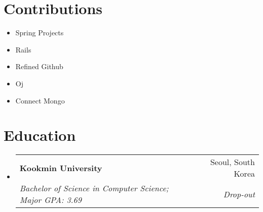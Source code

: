 \documentclass[letterpaper,11pt]{article}
\makeatletter
\newcommand{\resumeItem}[2]{
  \item\small{
    \textbf{#1}{: #2 \vspace{-2pt}}
  }
}
\newcommand{\resumeSubheading}[4]{
  \vspace{-1pt}\item
    \begin{tabular*}{0.97\textwidth}[t]{l@{\extracolsep{\fill}}r}
      \textbf{#1} & #2 \\
      \textit{\small#3} & \textit{\small #4} \\
    \end{tabular*}\vspace{-5pt}
}
\newcommand{\resumeSubItem}[2]{\resumeItem{#1}{#2}\vspace{-4pt}}
\newcommand{\resumeSubHeadingListStart}{\begin{itemize}[leftmargin=*]}
\newcommand{\resumeSubHeadingListEnd}{\end{itemize}}
\makeatother
\begin{document}
\section{Contributions}
  \resumeSubHeadingListStart
    \item{Spring Projects}
    \item{Rails}
    \item{Refined Github}
    \item{Oj}
    \item{Connect Mongo}
  \resumeSubHeadingListEnd


\section{Education}
  \resumeSubHeadingListStart
    \resumeSubheading
      {Kookmin University}{Seoul, South Korea}
      {Bachelor of Science in Computer Science; Major GPA: 3.69}{Drop-out}
  \resumeSubHeadingListEnd



\end{document}
